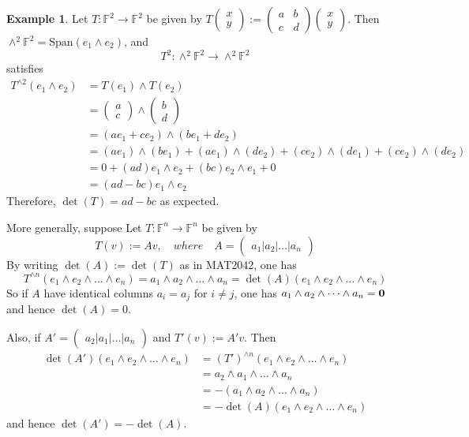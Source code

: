 \documentclass[11pt,openany]{book}
\theoremstyle{plain}
\theoremstyle{definition}
\newtheorem{example}[example]{Example}
\theoremstyle{remark}
\begin{document}
\begin{example}
    Let $T : \mathbb{F}^2 \to \mathbb{F}^2$ be given by $T\begin{pmatrix} x \\ y \end{pmatrix} := \begin{pmatrix} a & b \\ c & d \end{pmatrix} \begin{pmatrix} x \\ y \end{pmatrix}$. Then $\wedge^2 \mathbb{F}^2 = \mathrm{Span}(e_1 \wedge e_2)$, and
    $$T^2: \wedge^2 \mathbb{F}^2 \to \wedge^2 \mathbb{F}^2$$
    satisfies
\begin{align*}
    T^{\wedge 2}(e_1 \wedge e_2) &= T(e_1) \wedge T(e_2) \\
    &= \begin{pmatrix} a \\ c \end{pmatrix} \wedge \begin{pmatrix} b \\ d \end{pmatrix} \\
    &= (ae_1 + ce_2) \wedge (be_1 + de_2) \\
&= (ae_1)\wedge(be_1) + (ae_1)\wedge(de_2) + (ce_2)\wedge(de_1) + (ce_2)\wedge(de_2) \\
&= 0 + (ad)e_1 \wedge e_2 + (bc)e_2 \wedge e_1 + 0 \\
&= (ad - bc)e_1 \wedge e_2
\end{align*}
Therefore, $\det(T) = ad - bc$ as expected.
\end{example}

More generally, suppose 
   Let $T : \mathbb{F}^n \to \mathbb{F}^n$ be given by 
   $$T(v) := Av, \quad where\quad A = \begin{pmatrix} a_1 | a_2 | \dots | a_n \end{pmatrix}$$
   By writing $\det(A) := \det(T)$ as in MAT2042, one has
   $$T^{\wedge n}(e_1 \wedge e_2 \wedge \dots \wedge e_n) = a_1 \wedge a_2 \wedge \dots \wedge a_n = \det(A) (e_1 \wedge e_2 \wedge \dots \wedge e_n)$$
   So if $A$ have identical columns $a_i = a_j$ for $i \neq j$, one has
   $a_1 \wedge a_2 \wedge \dots \wedge a_n = {\bf 0}$ and hence 
   $\det(A) = 0$.

   Also, if $A' = \begin{pmatrix} a_2 | a_1 | \dots | a_n \end{pmatrix}$ and $T'(v) := A'v$. Then 
   \begin{align*}
   \det(A') (e_1 \wedge e_2 \wedge \dots \wedge e_n) &= (T')^{\wedge n}(e_1 \wedge e_2 \wedge \dots \wedge e_n) \\
   &= a_2 \wedge a_1 \wedge \dots \wedge a_n \\ 
   &= - (a_1 \wedge a_2 \wedge \dots \wedge a_n) \\
   &= -\det(A) (e_1 \wedge e_2 \wedge \dots \wedge e_n)\end{align*}
   and hence $\det(A') = -\det(A)$.
\end{document}
